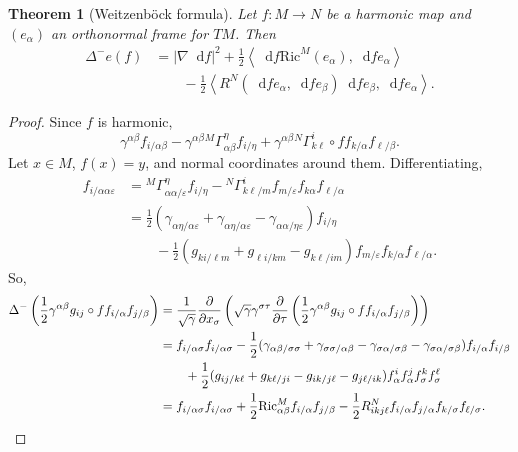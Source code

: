 \documentclass[reqno,12pt,letterpaper]{amsart}
\newcommand{\Ric}{\mathrm{Ric}}
\newcommand*\dif{\mathop{}\!\mathrm{d}}
\newcommand{\parl}{\left(}
\newcommand{\parr}{\right)}
\newcommand{\bral}{\left\langle}
\newcommand{\brar}{\right\rangle}
\newtheorem{theorem}{Theorem}[section]
\theoremstyle{definition}
\numberwithin{equation}{section}
\begin{document}
\begin{theorem}[Weitzenb\"ock formula]
Let $f: M \to N$ be a harmonic map and $(e_\alpha)$ an orthonormal frame for $TM$. Then 
\begin{align*}
\Delta^- e(f) &= |\nabla \dif f|^2 + \frac{1}{2} \bral \dif f \Ric^M(e_\alpha), \dif f e_\alpha \brar \\
&\qquad - \frac{1}{2} \bral R^N(\dif f e_\alpha, \dif f e_\beta) \dif f e_\beta, \dif f e_\alpha \brar.
\end{align*}
\end{theorem}
\begin{proof}
Since $f$ is harmonic,
$$\gamma^{\alpha \beta} f_{i/\alpha\beta} - \gamma^{\alpha\beta} {}^M \Gamma_{\alpha \beta}^\eta f_{i/\eta} + \gamma^{\alpha\beta} {}^N \Gamma_{k\ell}^i \circ f f_{k/\alpha} f_{\ell/\beta}.$$
Let $x \in M$, $f(x) = y$, and normal coordinates around them. Differentiating,
\begin{align*}
f_{i/\alpha \alpha \varepsilon} &= {}^M \Gamma_{\alpha\alpha/\varepsilon}^\eta f_{i/\eta} - {}^N \Gamma_{k\ell/m}^i f_{m/\varepsilon} f_{k\alpha} f_{\ell/\alpha} \\
&= \frac{1}{2} (\gamma_{\alpha \eta/\alpha \varepsilon} + \gamma_{\alpha \eta/\alpha \varepsilon} - \gamma_{\alpha \alpha/\eta \varepsilon}) f_{i/\eta} \\
&\qquad - \frac{1}{2} (g_{ki/\ell m} + g_{\ell i/km} - g_{k\ell/im}) f_{m/\varepsilon} f_{k/\alpha} f_{\ell/\alpha}.
\end{align*}
So,
\begin{align*}
\Delta^- \parl \frac{1}{2} \gamma^{\alpha \beta} g_{ij} \circ f f_{i/\alpha} f_{j/\beta} \parr &= \frac{1}{\sqrt \gamma} \frac{\partial}{\partial x_\sigma} \parl \sqrt \gamma \gamma^{\sigma \tau} \frac{\partial}{\partial \tau} \parl \frac{1}{2} \gamma^{\alpha \beta} g_{ij} \circ f f_{i/\alpha} f_{j/\beta} \parr \parr \\
&= f_{i/\alpha \sigma} f_{i/\alpha \sigma} - \frac{1}{2} (\gamma_{\alpha \beta/\sigma \sigma} + \gamma_{\sigma\sigma/\alpha \beta} - \gamma_{\sigma\alpha/\sigma \beta} - \gamma_{\sigma \alpha/\sigma \beta}) f_{i/\alpha} f_{i/\beta} \\
&\qquad + \frac{1}{2} (g_{ij/k\ell} + g_{k\ell/ji} - g_{ik/j\ell} - g_{j\ell/ik}) f_\alpha^i f_\alpha^j f_\sigma^k f_\sigma^\ell \\
&= f_{i/\alpha \sigma} f_{i/\alpha \sigma} + \frac{1}{2} \Ric^M_{\alpha \beta} f_{i/\alpha} f_{j/\beta} - \frac{1}{2} R^N_{ikj\ell} f_{i/\alpha} f_{j/\alpha} f_{k/\sigma} f_{\ell/\sigma}. \qedhere
\end{align*}
\end{proof}
\end{document}
